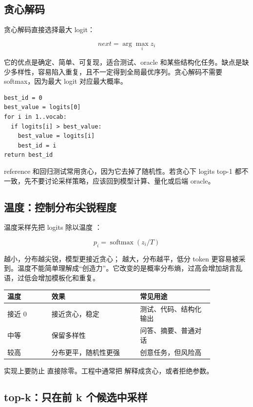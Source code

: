 \subsection{贪心解码}

贪心解码直接选择最大 logit：

\[
next = \arg\max_i z_i
\]

它的优点是确定、简单、可复现，适合测试、oracle 和某些结构化任务。缺点是缺少多样性，容易陷入重复，且不一定得到全局最优序列。贪心解码不需要 softmax，因为最大 logit 对应最大概率。

\begin{lstlisting}[numbers=none,caption={贪心解码}]
best_id = 0
best_value = logits[0]
for i in 1..vocab:
  if logits[i] > best_value:
    best_value = logits[i]
    best_id = i
return best_id
\end{lstlisting}

reference 和回归测试常用贪心，因为它去掉了随机性。若贪心下 logits top-1 都不一致，先不要讨论采样策略，应该回到模型计算、量化或后端 oracle。

\subsection{温度：控制分布尖锐程度}

温度采样先把 logits 除以温度 ：

\[
p_i = \operatorname{softmax}(z_i / T)
\]

 越小，分布越尖锐，模型更接近贪心； 越大，分布越平，低分 token 更容易被采到。温度不能简单理解成“创造力”。它改变的是概率分布熵，过高会增加胡言乱语，过低会增加模板化和重复。

\begin{center}
\begin{tabular}{p{0.18\linewidth}p{0.36\linewidth}p{0.30\linewidth}}
\toprule
温度 & 效果 & 常见用途 \\
\midrule
接近 0 & 接近贪心，稳定 & 测试、代码、结构化输出 \\
中等 & 保留多样性 & 问答、摘要、普通对话 \\
较高 & 分布更平，随机性更强 & 创意任务，但风险高 \\
\bottomrule
\end{tabular}
\end{center}

实现上要防止  直接除零。工程中通常把  解释成贪心，或者拒绝参数。

\subsection{top-k：只在前 k 个候选中采样}

